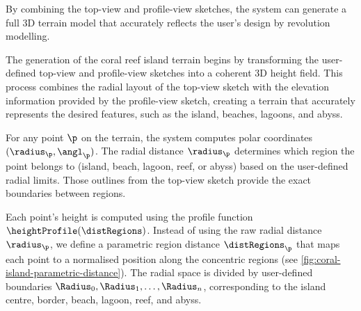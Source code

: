 By combining the top-view and profile-view sketches, the system can generate a full 3D terrain model that accurately reflects the user's design by revolution modelling.

The generation of the coral reef island terrain begins by transforming the user-defined top-view and profile-view sketches into a coherent 3D height field. This process combines the radial layout of the top-view sketch with the elevation information provided by the profile-view sketch, creating a terrain that accurately represents the desired features, such as the island, beaches, lagoons, and abyss.

For any point $\p$ on the terrain, the system computes polar coordinates $(\radius_\p, \angl_\p)$. The radial distance $\radius_\p$ determines which region the point belongs to (island, beach, lagoon, reef, or abyss) based on the user-defined radial limits. Those outlines from the top-view sketch provide the exact boundaries between regions.

Each point's height is computed using the profile function $\heightProfile(\distRegions)$. Instead of using the raw radial distance $\radius_\p$, we define a parametric region distance $\distRegions_\p$ that maps each point to a normalised position along the concentric regions (see \cref{fig:coral-island-parametric-distance}). The radial space is divided by user-defined boundaries $\Radius_0, \Radius_1, \dots, \Radius_n$, corresponding to the island centre, border, beach, lagoon, reef, and abyss.




